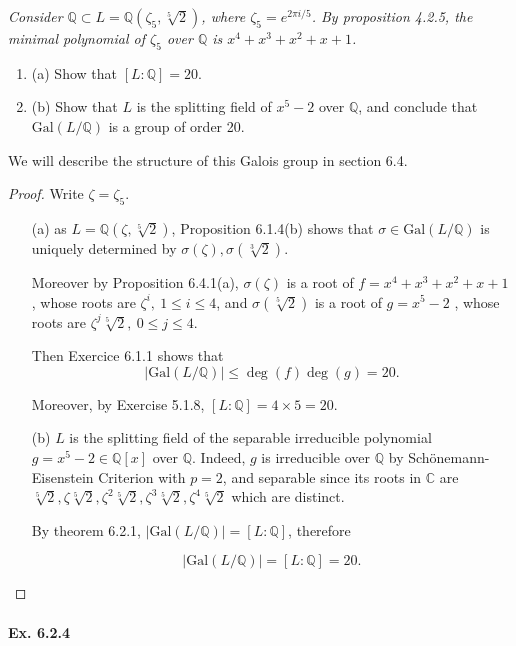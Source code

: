 \documentclass[11pt,a4paper]{article}
\newcommand{\be} {\begin{enumerate}}
\newcommand{\ee} {\end{enumerate}}
\newcommand{\Q}{\mathbb{Q}}
\newcommand{\C}{\mathbb{C}}
\newcommand{\Gal}{\mathrm{Gal}}
\begin{document}
{\it Consider $\Q \subset L = \Q(\zeta_5, \sqrt[5]{2})$, where $\zeta_5 = e^{2 \pi i /5}$. By proposition 4.2.5, the minimal polynomial of $\zeta_5$ over $\Q$ is $x^4+x^3+x^2+x+1$.
\be
\item[(a)] Show that $[L:\Q] = 20$.
\item[(b)] Show that $L$ is the splitting field of $x^5-2$ over $\Q$, and conclude that $\Gal(L/\Q)$ is a group of order 20.
\ee
We will describe the structure of this Galois group in section 6.4.
}

\begin{proof}
Write $\zeta = \zeta_5$.
\begin{enumerate}
\item[(a)]
as $L = \Q(\zeta,\sqrt[5]{2})$, Proposition 6.1.4(b) shows that $\sigma \in \mathrm{Gal}(L/\Q)$ is uniquely determined by $\sigma(\zeta),\sigma(\sqrt[3]{2})$.

Moreover by Proposition 6.4.1(a), $\sigma(\zeta)$ is a root of $f = x^4+x^3+x^2+x+1$, whose roots are $\zeta^i,\ 1\leq i \leq 4$, and $\sigma(\sqrt[5]{2})$ is a root of $g = x^5-2$ , whose roots are $\zeta^j \sqrt[5]{2},\ 0 \leq j \leq 4$.

Then Exercice 6.1.1 shows that $$\vert \mathrm{Gal}(L/\Q)\vert \leq \deg(f)\deg(g)=20.$$

Moreover, by Exercise 5.1.8, $[L:\Q]=4 \times 5 = 20$.

\item[(b)]
$L$ is the splitting field of the separable irreducible polynomial $g = x^5-2\in \Q[x]$ over $\Q$. Indeed,  $g$ is  irreducible over $\Q$ by Sch\"onemann-Eisenstein Criterion with $p=2$, and separable since its roots in $\C$ are $\sqrt[5]{2}, \zeta\sqrt[5]{2},\zeta^2 \sqrt[5]{2},\zeta^3 \sqrt[5]{2},\zeta^4\sqrt[5]{2}$ which are distinct.

By theorem 6.2.1, $\vert \mathrm{Gal}(L/\Q)\vert = [L:\Q]$, therefore

$$\vert \mathrm{Gal}(L/\Q)\vert = [L:\Q]=20.$$
\end{enumerate}
\end{proof}

\paragraph{Ex. 6.2.4}
\end{document}
